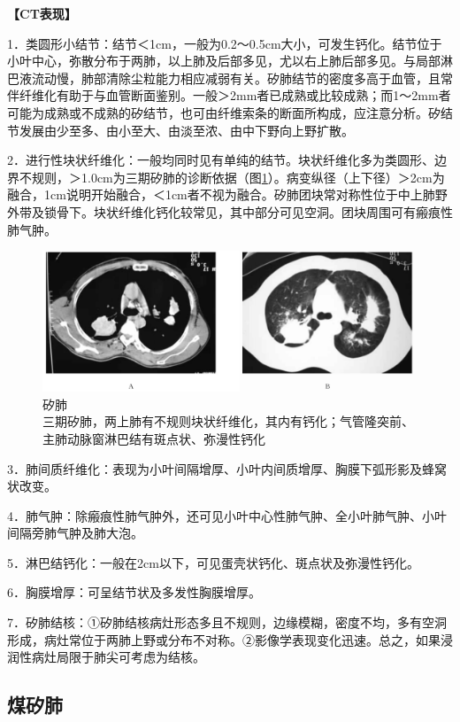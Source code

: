 \textbf{【CT表现】}

1．类圆形小结节：结节＜1cm，一般为0.2～0.5cm大小，可发生钙化。结节位于小叶中心，弥散分布于两肺，以上肺及后部多见，尤以右上肺后部多见。与局部淋巴液流动慢，肺部清除尘粒能力相应减弱有关。矽肺结节的密度多高于血管，且常伴纤维化有助于与血管断面鉴别。一般＞2mm者已成熟或比较成熟；而1～2mm者可能为成熟或不成熟的矽结节，也可由纤维索条的断面所构成，应注意分析。矽结节发展由少至多、由小至大、由淡至浓、由中下野向上野扩散。

2．进行性块状纤维化：一般均同时见有单纯的结节。块状纤维化多为类圆形、边界不规则，＞1.0cm为三期矽肺的诊断依据（图\ref{fig9-36}）。病变纵径（上下径）＞2cm为融合，1cm说明开始融合，＜1cm者不视为融合。矽肺团块常对称性位于中上肺野外带及锁骨下。块状纤维化钙化较常见，其中部分可见空洞。团块周围可有瘢痕性肺气肿。

\begin{figure}[!htbp]
 \centering
 \includegraphics[width=.7\textwidth,height=\textheight,keepaspectratio]{./images/Image00227.jpg}
 \captionsetup{justification=centering}
 \caption{矽肺\\{\small 三期矽肺，两上肺有不规则块状纤维化，其内有钙化；气管隆突前、主肺动脉窗淋巴结有斑点状、弥漫性钙化}}
 \label{fig9-36}
  \end{figure} 

3．肺间质纤维化：表现为小叶间隔增厚、小叶内间质增厚、胸膜下弧形影及蜂窝状改变。

4．肺气肿：除瘢痕性肺气肿外，还可见小叶中心性肺气肿、全小叶肺气肿、小叶间隔旁肺气肿及肺大泡。

5．淋巴结钙化：一般在2cm以下，可见蛋壳状钙化、斑点状及弥漫性钙化。

6．胸膜增厚：可呈结节状及多发性胸膜增厚。

7．矽肺结核：①矽肺结核病灶形态多且不规则，边缘模糊，密度不均，多有空洞形成，病灶常位于两肺上野或分布不对称。②影像学表现变化迅速。总之，如果浸润性病灶局限于肺尖可考虑为结核。

\subsection{煤矽肺}

